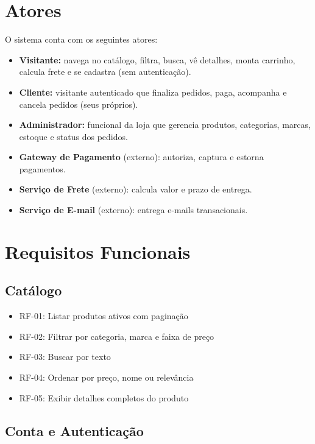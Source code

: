 \documentclass[12pt,a4paper]{article}
\providecommand{\tightlist}{%
  \setlength{\itemsep}{0pt}\setlength{\parskip}{0pt}}
\begin{document}
\section{Atores}\label{sec:atores}

O sistema conta com os seguintes atores:

\begin{itemize}
\tightlist
\item \textbf{Visitante:} navega no catálogo, filtra, busca, vê detalhes,
  monta carrinho, calcula frete e se cadastra (sem autenticação).
\item \textbf{Cliente:} visitante autenticado que finaliza pedidos, paga,
  acompanha e cancela pedidos (seus próprios).
\item \textbf{Administrador:} funcional da loja que gerencia produtos,
  categorias, marcas, estoque e status dos pedidos.
\item \textbf{Gateway de Pagamento} (externo): autoriza, captura e estorna
  pagamentos.
\item \textbf{Serviço de Frete} (externo): calcula valor e prazo de entrega.
\item \textbf{Serviço de E-mail} (externo): entrega e-mails transacionais.
\end{itemize}

\section{Requisitos Funcionais}\label{sec:rf}

\subsection{Catálogo}

\begin{itemize}
\tightlist
\item RF-01: Listar produtos ativos com paginação
\item RF-02: Filtrar por categoria, marca e faixa de preço
\item RF-03: Buscar por texto
\item RF-04: Ordenar por preço, nome ou relevância
\item RF-05: Exibir detalhes completos do produto
\end{itemize}

\subsection{Conta e Autenticação}
\end{document}
